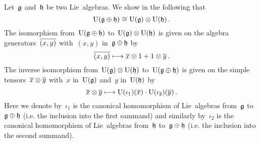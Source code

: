 \begin{example}
	\label{explicit isomorphism for uea of direct sum}
	Let~$\mathfrak{g}$ and~$\mathfrak{h}$ be two Lie~algebras.
	We show in the following that
	\[
		\Univ(\glie \oplus \hlie)
		\cong
		\Univ(\glie) \tensor \Univ(\hlie) \,.
		\index{universal enveloping algebra!of the direct sum of Lie algebras}
	\]
	The isomorphism from~$\operatorname{U}(\mathfrak{g} \oplus \mathfrak{h})$ to~$\operatorname{U}(\mathfrak{g}) \otimes \operatorname{U}(\mathfrak{h})$ is given on the algebra generators~$\overline{(x,y)}$ with~$(x,y)$ in~$\mathfrak{g} \oplus \mathfrak{h}$ by
	\[
		\class{(x,y)}
		\mapsto
		\class{x} \tensor 1 + 1 \tensor \class{y} \,.
	\]
	The inverse isomorphism from~$\operatorname{U}(\mathfrak{g}) \otimes \operatorname{U}(\mathfrak{h})$ to~$\operatorname{U}(\mathfrak{g} \oplus \mathfrak{h})$ is given on the simple tensors~$\overline{x} \otimes \overline{y}$ with~$x$ in~$\operatorname{U}(\mathfrak{g})$ and~$y$ in~$\operatorname{U}(\mathfrak{h})$ by
	\[
		\class{x} \tensor \class{y}
		\mapsto
		\Univ( \iota_1 )( \class{x} )
		\cdot
		\Univ( \iota_2 )( \class{y} ) \,.
	\]
	Here we denote by~$\iota_1$ is the canonical homomorphism of Lie~algebras from~$\mathfrak{g}$ to~$\mathfrak{g} \oplus \mathfrak{h}$ (i.e. the inclusion into the first sammand) and similarly by~$\iota_2$ is the canonical homomorphism of Lie~algebras from~$\mathfrak{h}$ to~$\mathfrak{g} \oplus \mathfrak{h}$ (i.e. the inclusion into the second summand).


\end{example}
